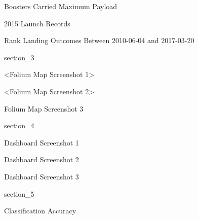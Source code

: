 \begin{frame}{Boosters Carried Maximum Payload}

\end{frame}

\begin{frame}{2015 Launch Records}

\end{frame}

\begin{frame}{Rank Landing Outcomes Between 2010-06-04 and 2017-03-20}

\end{frame}

{
{section_3}
\begin{frame}[plain]
\end{frame}
}

\begin{frame}{<Folium Map Screenshot 1>}

\end{frame}

\begin{frame}{<Folium Map Screenshot 2>}

\end{frame}

\begin{frame}{Folium Map Screenshot 3}

\end{frame}

{
{section_4}
\begin{frame}[plain]
\end{frame}
}

\begin{frame}{Dashboard Screenshot 1}

\end{frame}

\begin{frame}{Dashboard Screenshot 2}

\end{frame}

\begin{frame}{Dashboard Screenshot 3}

\end{frame}

{
{section_5}
\begin{frame}[plain]
\end{frame}
}

\begin{frame}{Classification Accuracy}

\end{frame}

